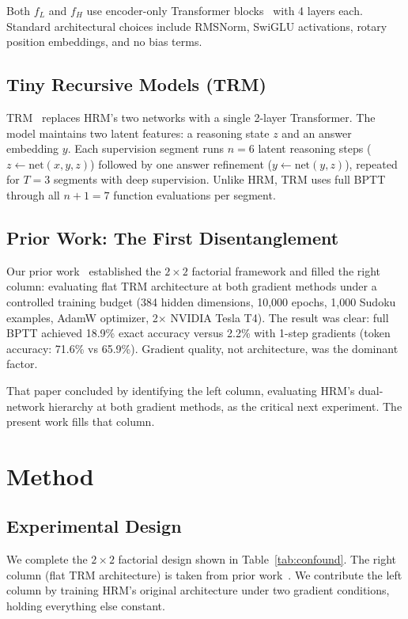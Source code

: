 \documentclass{article}
\begin{document}
Both $f_L$ and $f_H$ use encoder-only Transformer blocks~\cite{vaswani2017attention} with 4 layers each. Standard architectural choices include RMSNorm, SwiGLU activations, rotary position embeddings, and no bias terms.

\subsection{Tiny Recursive Models (TRM)}

TRM~\cite{jolicoeur2025trm} replaces HRM's two networks with a single 2-layer Transformer. The model maintains two latent features: a reasoning state $z$ and an answer embedding $y$. Each supervision segment runs $n=6$ latent reasoning steps ($z \leftarrow \text{net}(x, y, z)$) followed by one answer refinement ($y \leftarrow \text{net}(y, z)$), repeated for $T=3$ segments with deep supervision. Unlike HRM, TRM uses full BPTT through all $n+1=7$ function evaluations per segment.

\subsection{Prior Work: The First Disentanglement}

Our prior work~\cite{jj2025disentangling} established the $2\times2$ factorial framework and filled the right column: evaluating flat TRM architecture at both gradient methods under a controlled training budget (384 hidden dimensions, 10,000 epochs, 1,000 Sudoku examples, AdamW optimizer, 2$\times$ NVIDIA Tesla T4). The result was clear: full BPTT achieved 18.9\% exact accuracy versus 2.2\% with 1-step gradients (token accuracy: 71.6\% vs 65.9\%). Gradient quality, not architecture, was the dominant factor.

That paper concluded by identifying the left column, evaluating HRM's dual-network hierarchy at both gradient methods, as the critical next experiment. The present work fills that column.

\section{Method}

\subsection{Experimental Design}

We complete the $2\times2$ factorial design shown in Table~\ref{tab:confound}. The right column (flat TRM architecture) is taken from prior work~\cite{jj2025disentangling}. We contribute the left column by training HRM's original architecture under two gradient conditions, holding everything else constant.
\end{document}

